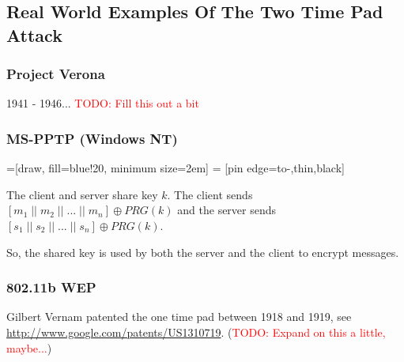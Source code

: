 \documentclass[11pt,a4paper]{report}
\newcommand\todo[1]{\noindent\textcolor{red}{TODO: #1}}
\begin{document}
\subsection{Real World Examples Of The Two Time Pad Attack}
\subsubsection{Project Verona}
1941 - 1946... \todo{Fill this out a bit}

\subsubsection{MS-PPTP (Windows NT)}

=[draw, fill=blue!20, minimum size=2em]
 = [pin edge={to-,thin,black}]
\begin{center}
\end{center}

\noindent
The client and server share key $k$. The client sends $[m_1 \;\big\vert\big\vert\; m_2 \;\big\vert\big\vert\; ... \;\big\vert\big\vert\; m_n ] \oplus PRG(k)$ and the server sends $[s_1 \;\big\vert\big\vert\; s_2 \;\big\vert\big\vert\; ... \;\big\vert\big\vert\; s_n ] \oplus PRG(k)$.

So, the shared key is used by both the server and the client to encrypt messages.

\subsubsection{802.11b WEP}


\begin{thebibliography}{9} 
	 Gilbert Vernam patented the one time pad between 1918 and 1919, see \url{http://www.google.com/patents/US1310719}. (\todo{Expand on this a little, maybe...})
\end{thebibliography}
\end{document}
